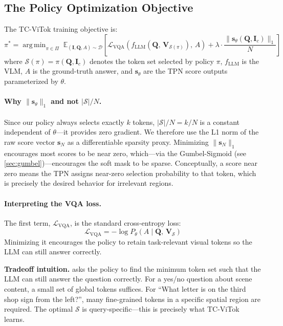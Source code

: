 \documentclass[12pt,a4paper]{article}
\DeclareMathOperator*{\argmin}{arg\,min}
\newcommand{\E}{\mathbb{E}}
\newcommand{\vs}{\mathbf{s}}     %
\newcommand{\mI}{\mathbf{I}}     %
\newcommand{\mQ}{\mathbf{Q}}     %
\newcommand{\mV}{\mathbf{V}}     %
\begin{document}
\subsection{The Policy Optimization Objective}

\begin{mathbox}
The TC-ViTok training objective is:
\begin{equation}
  \pi^* = \argmin_{\pi \in \Pi} \;
    \E_{(\mI, \mQ, A) \sim \mathcal{D}} \left[
      \mathcal{L}_{\mathrm{VQA}}\!\left(
        f_{\mathrm{LLM}}\!\left(\mQ,\, \mV_{\mathcal{S}(\pi)}\right),\, A
      \right)
      + \lambda \cdot \frac{\|\vs_\theta(\mQ, \mI_c)\|_1}{N}
    \right]
  \label{eq:objective}
\end{equation}
where $\mathcal{S}(\pi) = \pi(\mQ, \mI_c)$ denotes the token set selected by
policy $\pi$, $f_{\mathrm{LLM}}$ is the VLM, $A$ is the ground-truth answer,
and $\vs_\theta$ are the TPN score outputs parameterized by $\theta$.
\end{mathbox}

\paragraph{Why $\|\vs_\theta\|_1$ and not $|\mathcal{S}|/N$.}
Since our policy always selects exactly $k$ tokens, $|\mathcal{S}|/N = k/N$ is
a constant independent of $\theta$---it provides zero gradient. We therefore use
the L1 norm of the raw score vector $\vs_N$ as a differentiable sparsity proxy.
Minimizing $\|\vs_N\|_1$ encourages most scores to be near zero, which---via
the Gumbel-Sigmoid (see \cref{sec:gumbel})---encourages the soft mask to be
sparse. Conceptually, a score near zero means the TPN assigns near-zero selection
probability to that token, which is precisely the desired behavior for irrelevant
regions.

\paragraph{Interpreting the VQA loss.}
The first term, $\mathcal{L}_{\mathrm{VQA}}$, is the standard cross-entropy loss:
\[
  \mathcal{L}_{\mathrm{VQA}} = -\log P_\theta(A \mid \mQ,\, \mV_\mathcal{S})
\]
Minimizing it encourages the policy to retain task-relevant visual tokens so the
LLM can still answer correctly.

\begin{intuitionbox}
  \textbf{Tradeoff intuition.}  asks the policy to find the
  minimum token set such that the LLM can still answer the question correctly.
  For a yes/no question about scene content, a small set of global tokens
  suffices. For ``What letter is on the third shop sign from the left?'', many
  fine-grained tokens in a specific spatial region are required. The optimal
  $\mathcal{S}$ is query-specific---this is precisely what TC-ViTok learns.
\end{intuitionbox}
\end{document}
